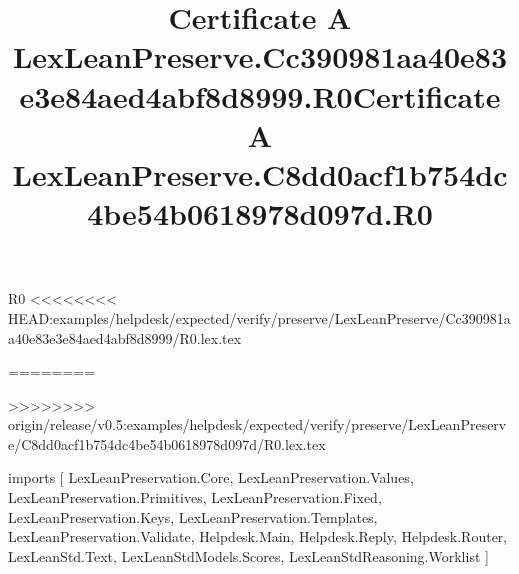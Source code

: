 \begin{lexlean}{R0}
<<<<<<<< HEAD:examples/helpdesk/expected/verify/preserve/LexLeanPreserve/Cc390981aa40e83e3e84aed4abf8d8999/R0.lex.tex
\title{Certificate A LexLeanPreserve.Cc390981aa40e83e3e84aed4abf8d8999.R0}
========
\title{Certificate A LexLeanPreserve.C8dd0acf1b754dc4be54b0618978d097d.R0}
>>>>>>>> origin/release/v0.5:examples/helpdesk/expected/verify/preserve/LexLeanPreserve/C8dd0acf1b754dc4be54b0618978d097d/R0.lex.tex
\begin{coremodule}
imports [
  LexLeanPreservation.Core,
  LexLeanPreservation.Values,
  LexLeanPreservation.Primitives,
  LexLeanPreservation.Fixed,
  LexLeanPreservation.Keys,
  LexLeanPreservation.Templates,
  LexLeanPreservation.Validate,
  Helpdesk.Main,
  Helpdesk.Reply,
  Helpdesk.Router,
  LexLeanStd.Text,
  LexLeanStdModels.Scores,
  LexLeanStdReasoning.Worklist
]


\end{coremodule}
\end{lexlean}
